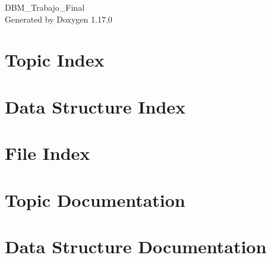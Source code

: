 \documentclass[twoside]{book}
\newcommand{\+}{\discretionary{\mbox{\scriptsize$\hookleftarrow$}}{}{}}
\newcommand{\clearemptydoublepage}{%
    \newpage{\pagestyle{empty}\cleardoublepage}%
  }
\begin{document}
  \raggedbottom
  \begin{titlepage}
  \vspace*{7cm}
  \begin{center}%
  {\Large DBM\+\_\+\+Trabajo\+\_\+\+Final}\\
  \vspace*{1cm}
  {\large Generated by Doxygen 1.17.0}\\
  \end{center}
  \end{titlepage}
  \clearemptydoublepage
  \tableofcontents
  \clearemptydoublepage
\chapter{Topic Index}

\chapter{Data Structure Index}

\chapter{File Index}

\chapter{Topic Documentation}








\chapter{Data Structure Documentation}










\end{document}
